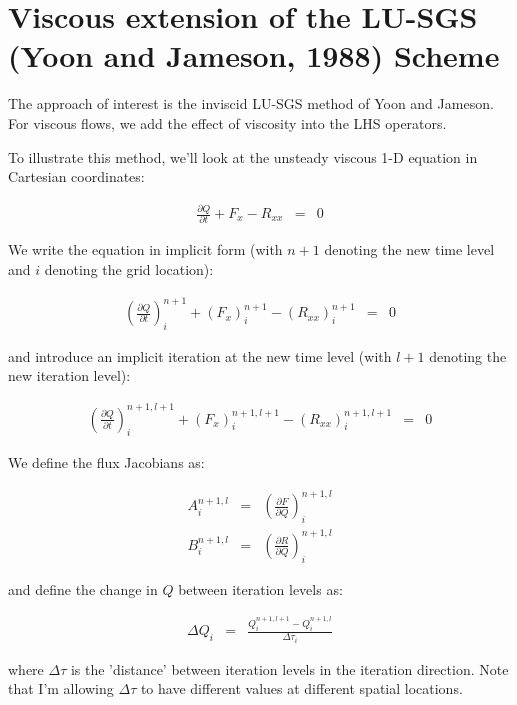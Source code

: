 \section{Viscous extension of the LU-SGS (Yoon and Jameson, 1988) Scheme}

The approach of interest is 
the inviscid LU-SGS method of Yoon and Jameson.  For viscous flows, we
add the effect of viscosity into the LHS operators.

To illustrate this method, we'll look
at the unsteady viscous 1-D equation in Cartesian coordinates:

\begin{eqnarray}
\frac{\partial Q}{\partial t} + F_{x} - R_{xx} &=& 0
\nonumber
\end{eqnarray}

We write the equation in implicit form (with $n+1$ denoting the
new time level and $i$ denoting the grid location):

\begin{eqnarray}
\left(\frac{\partial Q}{\partial t} \right)_i^{n+1} 
+ 
\left(F_x \right)_i^{n+1}  
- 
\left(R_{xx} \right)_i^{n+1} &=& 0
\nonumber
\end{eqnarray}

and introduce an implicit iteration at the new time level (with
$l+1$ denoting the new iteration level): 

\begin{eqnarray}
\left(\frac{\partial Q}{\partial t} \right)_i^{n+1,l+1} 
+ 
\left(F_x \right)_i^{n+1,l+1}  
- 
\left(R_{xx} \right)_i^{n+1,l+1} &=& 0
\nonumber
\end{eqnarray}

We define the flux Jacobians as:

\begin{eqnarray}
A^{n+1,l}_i &=& \left(\frac{\partial F}{\partial Q} \right)^{n+1,l}_i
\nonumber
\\
B^{n+1,l}_i &=& \left(\frac{\partial R}{\partial Q} \right)^{n+1,l}_i
\nonumber
\end{eqnarray}

and define the change in $Q$ between iteration levels as:

\begin{eqnarray}
\Delta Q_i &=& \frac{Q_i^{n+1,l+1} - Q_i^{n+1,l}}{\Delta \tau_i}
\nonumber
\end{eqnarray}

where $\Delta \tau$ is the 'distance' between iteration levels in the
iteration direction.  Note that I'm allowing $\Delta \tau$ to have different
values at different spatial locations.

